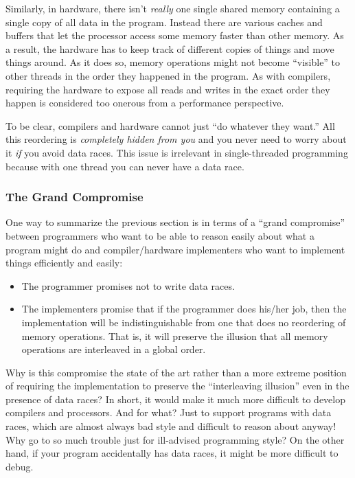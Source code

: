 \documentclass[10pt]{article}
\begin{document}
Similarly, in hardware, there isn't \emph{really} one single shared
memory containing a single copy of all data in the program.  Instead
there are various caches and buffers that let the processor access
some memory faster than other memory.  As a result, the hardware has
to keep track of different copies of things and move things around.
As it does so, memory operations might not become ``visible'' to other
threads in the order they happened in the program.  As with compilers,
requiring the hardware to expose all reads and writes in the exact
order they happen is considered too onerous from a performance
perspective.

To be clear, compilers and hardware cannot just ``do whatever they
want.''  All this reordering is \emph{completely hidden from you} and
you never need to worry about it \emph{if} you avoid data races.  This
issue is irrelevant in single-threaded programming because with one
thread you can never have a data race.

\subsubsection{The Grand Compromise}

One way to summarize the previous section is in terms of a ``grand
compromise'' between programmers who want to be able to reason easily
about what a program might do and compiler/hardware implementers who
want to implement things efficiently and easily:
\begin{itemize}
\item The programmer promises not to write data races.
\item The implementers promise that if the programmer does his/her
  job, then the implementation will be indistinguishable from one that
  does no reordering of memory operations.  That is, it will preserve
  the illusion that all memory operations are interleaved in a global
  order.
\end{itemize}

Why is this compromise the state of the art rather than a more extreme
position of requiring the implementation to preserve the
``interleaving illusion'' even in the presence of data races?  In
short, it would make it much more difficult to develop compilers and
processors.  And for what?  Just to support programs with data races,
which are almost always bad style and difficult to reason about
anyway!  Why go to so much trouble just for ill-advised programming
style?  On the other hand, if your program accidentally has data
races, it might be more difficult to debug.
\end{document}
